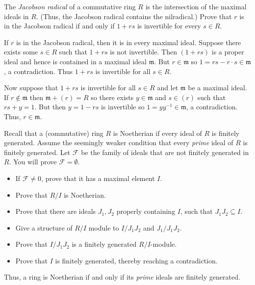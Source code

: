 \documentclass[../../master.tex]{subfiles}
\begin{document}
    \begin{problem}
        The \textit{Jacobson radical} of a commutative ring $R$ is the
        intersection of the maximal ideals in $R$. (Thus, the Jacobson radical
        contains the nilradical.) Prove that $r$ is in the Jacobson radical if
        and only if $1 + rs$ is invertible for every $s \in R$.
    \end{problem}

    \begin{solution}
        If $r$ is in the Jacobson radical, then it is in every maximal ideal.
        Suppose there exists some $s \in R$ such that $1 + rs$ is not
        invertible. Then $(1 + rs)$ is a proper ideal and hence is contained in
        a maximal ideal $\mathfrak{m}$. But $r \in \mathfrak{m}$ so $1 = rs - r
        \cdot s \in \mathfrak{m}$, a contradiction. Thus $1 + rs$ is invertible
        for all $s \in R$.

        Now suppose that $1 + rs$ is invertible for all $s \in R$ and let
        $\mathfrak{m}$ be a maximal ideal. If $r \notin \mathfrak{m}$ then
        $\mathfrak{m} + (r) = R$ so there exists $y \in \mathfrak{m}$ and $s \in
        (r)$ such that $rs + y = 1$. But then $y = 1 - rs$ is invertible so $1 =
        y y^{-1} \in \mathfrak{m}$, a contradiction. Thus, $r \in \mathfrak{m}$.
    \end{solution}

    \begin{problem}
        Recall that a (commutative) ring $R$ is Noetherian if every ideal of
        $R$ is finitely generated. Assume the seemingly weaker condition that
        every \textit{prime} ideal of $R$ is finitely generated. Let
        $\mathscr{F}$ be the family of ideals that are not finitely generated in
        $R$. You will prove $\mathscr{F} = \emptyset$.
        \begin{itemize}
            \item If $\mathscr{F} \neq 0$, prove that it has a maximal element
                $I$.
            \item Prove that $R / I$ is Noetherian.
            \item Prove that there are ideals $J_1, J_2$ properly containing $I$, such
                that $J_1 J_2 \subseteq I$.
            \item Give a structure of $R / I$ module to $I / J_1 J_2$ and $J_1 /
                J_1 J_2$.
            \item Prove that $I / J_1 J_2$ is a finitely generated $R /
                I$-module.
            \item Prove that $I$ is finitely generated, thereby reaching a
                contradiction.
        \end{itemize}
        Thus, a ring is Noetherian if and only if its \textit{prime} ideals are
        finitely generated.
    \end{problem}
\end{document}
